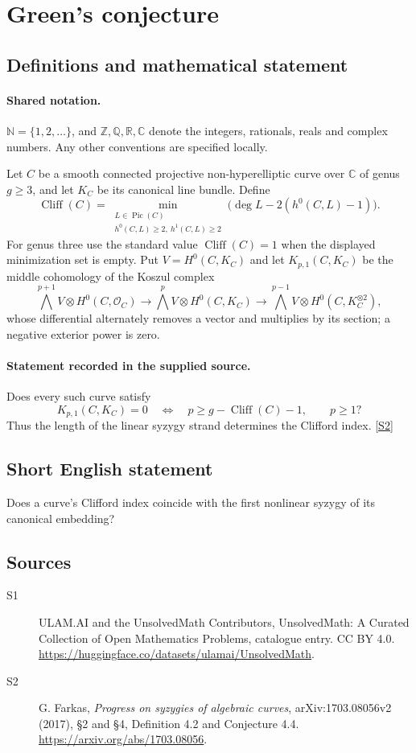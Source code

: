\documentclass[11pt]{article}
\newcommand{\sref}[2]{\hyperlink{source:#1:#2}{[S#2]}}
\begin{document}
\section{Green's conjecture}\label{statement}

\subsection{Definitions and mathematical statement}

\paragraph{Shared notation.}$\mathbb N=\{1,2,\ldots\}$, and $\mathbb Z,\mathbb Q,\mathbb R,\mathbb C$ denote the integers, rationals, reals and complex numbers. Any other conventions are specified locally.


Let $C$ be a smooth connected projective non-hyperelliptic curve over $\mathbb C$ of genus $g\geq3$, and let $K_C$ be its canonical line bundle. Define
\[\operatorname{Cliff}(C)=\min_{\substack{L\in\operatorname{Pic}(C)\\h^0(C,L)\geq2,\ h^1(C,L)\geq2}}\bigl(\deg L-2(h^0(C,L)-1)\bigr).
\]
For genus three use the standard value $\operatorname{Cliff}(C)=1$ when the displayed minimization set is empty. Put $V=H^0(C,K_C)$ and let $K_{p,1}(C,K_C)$ be the middle cohomology of the Koszul complex
\[\bigwedge^{p+1}V\otimes H^0(C,\mathcal O_C)\longrightarrow\bigwedge^pV\otimes H^0(C,K_C)\longrightarrow\bigwedge^{p-1}V\otimes H^0(C,K_C^{\otimes2}),
\]
whose differential alternately removes a vector and multiplies by its section; a negative exterior power is zero.
\paragraph{Statement recorded in the supplied source.}
Does every such curve satisfy
\[K_{p,1}(C,K_C)=0\quad\Longleftrightarrow\quad p\geq g-\operatorname{Cliff}(C)-1,\qquad p\geq1?
\]
Thus the length of the linear syzygy strand determines the Clifford index. \sref{statement}{2}
\subsection{Short English statement}
Does a curve’s Clifford index coincide with the first nonlinear syzygy of its canonical embedding?
\subsection{Sources}
\begin{description}
\item[\hypertarget{source:statement:1}{S1}] ULAM.AI and the UnsolvedMath Contributors, UnsolvedMath: A Curated Collection of Open Mathematics Problems, catalogue entry. CC BY 4.0. \url{https://huggingface.co/datasets/ulamai/UnsolvedMath}.
\item[\hypertarget{source:statement:2}{S2}] G. Farkas, \emph{Progress on syzygies of algebraic curves}, arXiv:1703.08056v2 (2017), §2 and §4, Definition 4.2 and Conjecture 4.4. \url{https://arxiv.org/abs/1703.08056}.
\end{description}
\label{end:statement}
\end{document}
